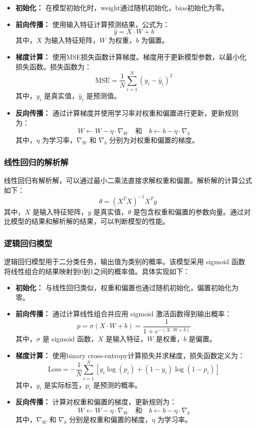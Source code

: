 \documentclass[12pt]{article}
\begin{document}
\begin{itemize}
    \item \textbf{初始化：} 在模型初始化时，weight通过随机初始化，bias初始化为零。
    \item \textbf{前向传播：} 使用输入特征计算预测结果，公式为：
    \[
    \hat{y} = X \cdot W + b
    \]
    其中，$X$ 为输入特征矩阵，$W$ 为权重，$b$ 为偏置。
    \item \textbf{梯度计算：} 使用MSE损失函数计算梯度。梯度用于更新模型参数，以最小化损失函数。损失函数为：
    \[
    \text{MSE} = \frac{1}{N} \sum_{i=1}^{N} (y_i - \hat{y}_i)^2
    \]
    其中，$y_i$ 是真实值，$\hat{y}_i$ 是预测值。
    \item \textbf{反向传播：} 通过计算梯度并使用学习率对权重和偏置进行更新，更新规则为：
    \[
    W \leftarrow W - \eta \cdot \nabla_W \quad \text{和} \quad b \leftarrow b - \eta \cdot \nabla_b
    \]
    其中，$\eta$ 为学习率，$\nabla_W$ 和 $\nabla_b$ 分别为对权重和偏置的梯度。
\end{itemize}
\subsubsection{线性回归的解析解}

线性回归有解析解，可以通过最小二乘法直接求解权重和偏置。解析解的计算公式如下：
\[
\theta = (X^T X)^{-1} X^T y
\]
其中，$X$ 是输入特征矩阵，$y$ 是真实值，$\theta$ 是包含权重和偏置的参数向量。通过对比模型的结果和解析解的结果，可以判断模型的性能。

\subsubsection{逻辑回归模型}

逻辑回归模型用于二分类任务，输出值为类别的概率。该模型采用 sigmoid 函数将线性组合的结果映射到0到1之间的概率值。具体实现如下：

\begin{itemize}
    \item \textbf{初始化：} 与线性回归类似，权重和偏置也通过随机初始化，偏置初始化为零。
    \item \textbf{前向传播：} 通过计算线性组合并应用 sigmoid 激活函数得到输出概率：
    \[
    p = \sigma(X \cdot W + b) = \frac{1}{1 + e^{-(X \cdot W + b)}}
    \]
    其中，$\sigma$ 是 sigmoid 函数，$X$ 是输入特征，$W$ 是权重，$b$ 是偏置。
    \item \textbf{梯度计算：} 使用binary cross-entropy计算损失并求梯度，损失函数定义为：
    \[
    \text{Loss} = -\frac{1}{N} \sum_{i=1}^{N} \left[ y_i \log(p_i) + (1 - y_i) \log(1 - p_i) \right]
    \]
    其中，$y_i$ 是实际标签，$p_i$ 是预测的概率。
    \item \textbf{反向传播：} 计算对权重和偏置的梯度，更新规则为：
    \[
    W \leftarrow W - \eta \cdot \nabla_W \quad \text{和} \quad b \leftarrow b - \eta \cdot \nabla_b
    \]
    其中，$\nabla_W$ 和 $\nabla_b$ 分别是权重和偏置的梯度，$\eta$ 为学习率。
\end{itemize}
\end{document}
